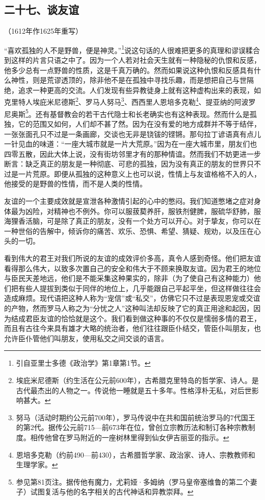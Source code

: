 \subsection*{二十七、谈友谊}
\begin{center}
    （1612年作1625年重写）
\end{center}
\par “喜欢孤独的人不是野兽，便是神灵。”\footnote{引自亚里士多德《政治学》第1章第1节。}说这句话的人很难把更多的真理和谬误糅合到这样的片言只语之中了。因为一个人若对社会天生就有一种隐秘的仇恨和反感，他多少总有一点野兽的性质，这是千真万确的。然而如果说这种仇恨和反感具有什么神性，则是荒谬透顶的，除非他不是在孤独中寻找乐趣，而是想把自己与世隔绝，追求一种更高的交流。人们发现有些异教徒身上就有这种虚构出来的表现，如克里特人埃庇米尼德斯\footnote{埃庇米尼德斯（约生活在公元前600年），古希腊克里特岛的哲学家、诗人。是古代最杰出的人物之一。传说他一睡就是五十多年。性格淳朴无私，对后世影响甚大。}、罗马人努马\footnote{努马（活动时期约公元前700年），罗马传说中在共和国前统治罗马的7代国王的第2代。据传公元前715—前673年在位，曾创立宗教历法和制订各种宗教制度。相传他曾在罗马附近的一座树林里得到仙女伊吉丽亚的指示。}、西西里人恩培多克勒\footnote{恩培多克勒（约前490—前430），古希腊哲学家、政治家、诗人、宗教教师和生理学家。}、提亚纳的阿波罗尼奥斯\footnote{参见第81页注。据传他有魔力，尤莉娅·多姆纳（罗马皇帝塞维鲁的第二个妻子）试图复活与他的名字相关的古代神话和异教崇拜。}。还有基督教会的若干古代隐士和长老确实也有这种表现。然而什么是孤独，它的范围又如何，人们却不甚了然。因为在没有爱的地方成群并不等于结伴，一张张面孔只不过是一条画廊，交谈也无非是铙钹的铿锵。那句拉丁谚语真有点儿一针见血的味道：“一座大城市就是一片大荒原。”因为在一座大城市里，朋友们也四零五散，因此大体上说，没有街坊邻里才有的那种情谊。然而我们不妨更进一步断言：缺乏真正的朋友是一种彻底、可悲的孤独，因为没有真正的朋友的世界只不过是一片荒原。即便从孤独的这种意义上也可以说，性情上与友谊格格不入的人，他接受的是野兽的性情，而不是人类的性情。
\par 友谊的一个主要成效就是宣泄各种激情引起的心中的憋闷。我们知道憋堵之症对身体最为凶险，对精神也不例外。你可以服菝葜养肝，服铁剂健脾，服硫华舒肺，服海狸香活脑，可是除了真正的朋友，没有一个处方可以开心。对于挚友，你可以在一种世俗的告解中，倾诉你的痛苦、欢乐、恐惧、希望、猜疑、规劝，以及压在心头的一切。
\par 看到伟大的君王对我们所说的友谊的成效评价多高，真令人感到奇怪。他们把友谊看得那么伟大，以致多次置自己的安全和伟大于不顾来换取友谊。因为君王的地位与臣民天差地远，他们是不能采集这种果实的，除非（为了使自己有这种能力）他们把有些人提拔到类似于同伴的地位上，几乎能跟自己平起平坐，但这样做往往会造成麻烦。现代语把这种人称为“宠信”或“私交”，仿佛它只不过是表现恩宠或交谊的产物，然而罗马人称之为“分忧之人”这种叫法却反映了它的真正用途和起因，因为结成君臣友谊的恰恰就是这个。我们看到做这种事的不仅仅是懦弱多情的君王，而且有古往今来具有雄才大略的统治者，他们往往跟臣仆结交，管臣仆叫朋友，也允许臣仆管他们叫朋友，使用私交之间交谈的语言。
